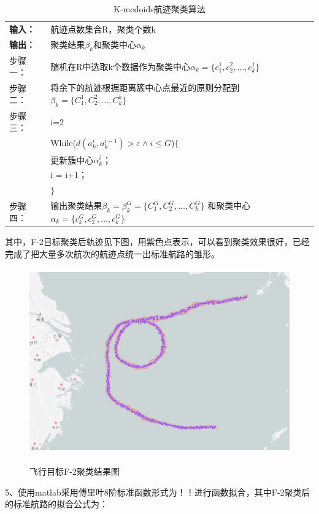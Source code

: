 \documentclass[GBK]{ctexart}
\begin{document}
\begin{spacing}{1.5}
\begin{table}[H]
  \centering
  \caption{K-medoids航迹聚类算法}
    \begin{tabular}{ll}
    \toprule[2.5pt]
    \textbf{输入：} & 航迹点数集合R，聚类个数k \\
    \textbf{输出：} & 聚类结果${\beta _k}$和聚类中心${\alpha _k}$ \\
    \midrule[1pt]
    步骤一：  & 随机在R中选取k个数据作为聚类中心${\alpha _k} = \{ c_1^1,c_2^2, \ldots ,c_k^1\} $  \\
    步骤二：  & 将余下的航迹根据距离簇中心点最近的原则分配到${\beta _k} = \{ C_1^1,C_2^2, \ldots ,C_k^k\} $  \\
    步骤三：  & i=2 \\
          & While($d(a_k^i,a_k^{i - 1}) > \varepsilon  \wedge i \le G$)$\{ $ \\
          & 更新簇中心$\alpha _k^i$； \\
          & i = i+1； \\
          &$\} $\\
    步骤四：  & 输出聚类结果${\beta _k} = \beta _k^G = \{ C_1^G,C_2^G, \ldots ,C_k^G\} $ 和聚类中心${\alpha _k} = \{ c_k^G,c_2^G, \ldots ,c_k^G\} $\\
    \bottomrule[2.5pt]
    \end{tabular}%
  \label{k}%
\end{table}%
其中，F-2目标聚类后轨迹见下图，用紫色点表示，可以看到聚类效果很好，已经完成了把大量多次航次的航迹点统一出标准航路的雏形。
\begin{figure}[H]
  \centering
  \includegraphics[width=15cm,height=8cm]{21}\\
  \caption{飞行目标F-2聚类结果图}\label{21}
\end{figure}
5、使用matlab采用傅里叶8阶标准函数形式为！！进行函数拟合，其中F-2聚类后的标准航路的拟合公式为：


\end{spacing}
\end{document}
